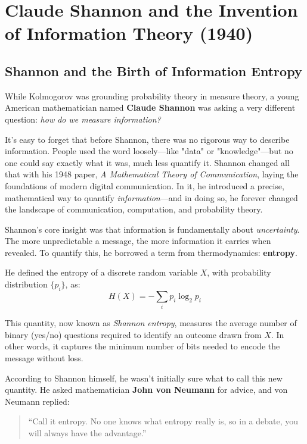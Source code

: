 \section{Claude Shannon and the Invention of Information Theory (1940)}


\subsection{Shannon and the Birth of Information Entropy}

While Kolmogorov was grounding probability theory in measure theory, a young American mathematician named \textbf{Claude Shannon} was asking a very different question: \emph{how do we measure information?}

It’s easy to forget that before Shannon, there was no rigorous way to describe information. People used the word loosely—like "data" or "knowledge"—but no one could say exactly what it was, much less quantify it. Shannon changed all that with his 1948 paper, \emph{A Mathematical Theory of Communication}, laying the foundations of modern digital communication. In it, he introduced a precise, mathematical way to quantify \emph{information}—and in doing so, he forever changed the landscape of communication, computation, and probability theory.

Shannon’s core insight was that information is fundamentally about \emph{uncertainty}. The more unpredictable a message, the more information it carries when revealed. To quantify this, he borrowed a term from thermodynamics: \textbf{entropy}.

He defined the entropy of a discrete random variable \( X \), with probability distribution \( \{p_i\} \), as:
\[
H(X) = - \sum_i p_i \log_2 p_i
\]

This quantity, now known as \emph{Shannon entropy}, measures the average number of binary (yes/no) questions required to identify an outcome drawn from \( X \). In other words, it captures the minimum number of bits needed to encode the message without loss.





According to Shannon himself, he wasn’t initially sure what to call this new quantity. He asked mathematician \textbf{John von Neumann} for advice, and von Neumann replied:

\begin{quote}
“Call it entropy. No one knows what entropy really is, so in a debate, you will always have the advantage.”
\end{quote}

